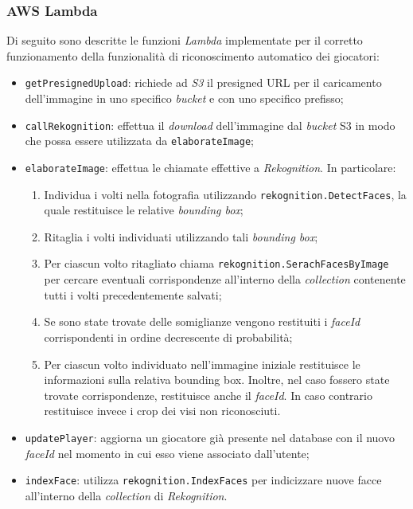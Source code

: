 	\subsubsection{AWS Lambda}
	Di seguito sono descritte le funzioni \emph{Lambda} implementate per il corretto funzionamento della funzionalità di riconoscimento automatico dei giocatori:
	\begin{itemize}
		\item \texttt{getPresignedUpload}: richiede ad \emph{S3} il presigned URL per il caricamento dell'immagine in uno specifico \emph{bucket} e con uno specifico prefisso;
		\item \texttt{callRekognition}: effettua il \emph{download} dell'immagine dal \emph{bucket} S3 in modo che possa essere utilizzata da \texttt{elaborateImage};
		\item \texttt{elaborateImage}: effettua le chiamate effettive a \emph{Rekognition}. In particolare:
			\begin{enumerate}
				\item Individua i volti nella fotografia utilizzando \texttt{rekognition.DetectFaces}, la quale restituisce le relative \emph{bounding box};
				\item Ritaglia i volti individuati utilizzando tali \emph{bounding box};
				\item Per ciascun volto ritagliato chiama \texttt{rekognition.SerachFacesByImage} per cercare eventuali corrispondenze all'interno della \emph{collection} contenente tutti i volti precedentemente salvati;
				\item Se sono state trovate delle somiglianze vengono restituiti i \emph{faceId} corrispondenti in ordine decrescente di probabilità;
				\item Per ciascun volto individuato nell'immagine iniziale restituisce le informazioni sulla relativa bounding box. Inoltre, nel caso fossero state trovate corrispondenze, restituisce anche il \emph{faceId}. In caso contrario restituisce invece i crop dei visi non riconosciuti.
			\end{enumerate}
		\item \texttt{updatePlayer}: aggiorna un giocatore già presente nel database con il nuovo \emph{faceId} nel momento in cui esso viene associato dall'utente;
		\item \texttt{indexFace}: utilizza \texttt{rekognition.IndexFaces} per indicizzare nuove facce all'interno della \emph{collection} di \emph{Rekognition}.
	\end{itemize}
	
